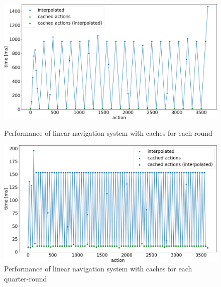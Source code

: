\begin{figure}
\centering
\includegraphics[width=\textwidth]{figures/pyplot/performance_navsystem-round-cache.png}
\caption{Performance of linear navigation system with caches for each round}
\label{fig:navsystem.performance.round}
\includegraphics[width=\textwidth]{figures/pyplot/performance_navsystem-qr-cache.png}
\caption{Performance of linear navigation system with caches for each quarter-round}
\label{fig:navsystem.performance.qr}
\end{figure}

